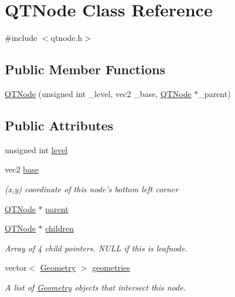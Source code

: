 \hypertarget{class_q_t_node}{\section{Q\+T\+Node Class Reference}
\label{class_q_t_node}
}


{\ttfamily \#include $<$qtnode.\+h$>$}

\subsection*{Public Member Functions}
\begin{DoxyCompactItemize}
\item 
\hyperlink{class_q_t_node_a02c24673835dc1747d9ba7a9f3c27b84}{Q\+T\+Node} (unsigned int \+\_\+level, vec2 \+\_\+base, \hyperlink{class_q_t_node}{Q\+T\+Node} $\ast$\+\_\+parent)
\end{DoxyCompactItemize}
\subsection*{Public Attributes}
\begin{DoxyCompactItemize}
\item 
unsigned int \hyperlink{class_q_t_node_a40d33fe4103a3a895137cfb08c246010}{level}
\item 
vec2 \hyperlink{class_q_t_node_a81dfd9fcf4b01c740ef373c1dca38765}{base}
\begin{DoxyCompactList}\small\item\em (x,y) coordinate of this node's bottom left corner \end{DoxyCompactList}\item 
\hyperlink{class_q_t_node}{Q\+T\+Node} $\ast$ \hyperlink{class_q_t_node_a1d8821384dae11149cb108440b108176}{parent}
\item 
\hyperlink{class_q_t_node}{Q\+T\+Node} $\ast$ \hyperlink{class_q_t_node_aacf4c1618f753633cb7ea9ddb76690f9}{children}
\begin{DoxyCompactList}\small\item\em Array of 4 child pointers. N\+U\+L\+L if this is leafnode. \end{DoxyCompactList}\item 
vector$<$ \hyperlink{class_geometry}{Geometry} $>$ \hyperlink{class_q_t_node_aa48645f4e491ae201feabd5199eb549e}{geometries}
\begin{DoxyCompactList}\small\item\em A list of \hyperlink{class_geometry}{Geometry} objects that intersect this node. \end{DoxyCompactList}\end{DoxyCompactItemize}


